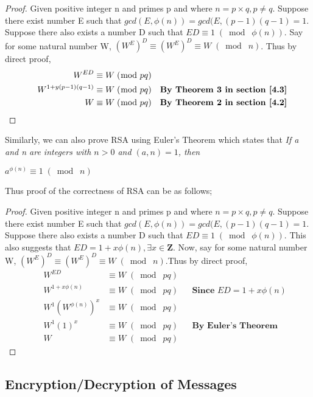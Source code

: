 \documentclass{article}
\begin{document}
\begin{proof}
Given positive integer n and primes p and where $n = p \times q, p \neq q$. Suppose there exist number E such that $gcd(E, \phi(n)) = gcd(E, (p-1)(q-1) = 1$. Suppose there also exists a number D such that $ED \equiv 1 \;(\bmod\; \phi(n))$. Say for some natural number W, $(W^E)^D \equiv (W^E)^D \equiv W \;(\bmod\; n)$. Thus by direct proof,
\begin{align*}
    &&W^{ED} &\equiv W \;(\bmod\; pq)&&\\
    &&W^{1 + y(p-1)(q-1)} &\equiv W \;(\bmod\; pq)&& \textbf{By Theorem 3 in section \ref{4.3}}\\
    &&W &\equiv W \;(\bmod\; pq)&& \textbf{By Theorem 2 in section \ref{4.2}}
\end{align*}
\end{proof}

Similarly, we can also prove RSA using Euler's Theorem which states that \textit{If a and n are integers with $n > 0$ and $(a, n) = 1$, then}
\begin{center}
    $a^{\phi(n)} \equiv 1 \;(\bmod\; n)$
\end{center}

Thus proof of the correctness of RSA can be as follows;
\begin{proof}
Given positive integer n and primes p and where $n = p \times q, p \neq q$. Suppose there exist number E such that $gcd(E, \phi(n)) = gcd(E, (p-1)(q-1) = 1$. Suppose there also exists a number D such that $ED \equiv 1 \;(\bmod\; \phi(n))$. This also suggests that $ED = 1 + x\phi(n), \exists x \in \mathbf{Z}$. Now, say for some natural number W, $(W^E)^D \equiv (W^E)^D \equiv W \;(\bmod\; n)$.Thus by direct proof,
\begin{align*}
    &&W^{ED} &\equiv W \;(\bmod\; pq)&&\\
    &&W^{1+x\phi(n)} &\equiv W \;(\bmod\; pq)&& \textbf{Since $ED = 1 + x\phi(n)$}\\
    &&W^{1}(W^{\phi(n)})^x &\equiv W \;(\bmod\; pq)&&\\
    &&W^{1}(1)^x &\equiv W \;(\bmod\; pq)&& \textbf{By Euler's Theorem}\\
    &&W &\equiv W \;(\bmod\; pq)&&
\end{align*}
\end{proof}


\subsection{Encryption/Decryption of Messages}
\end{document}
